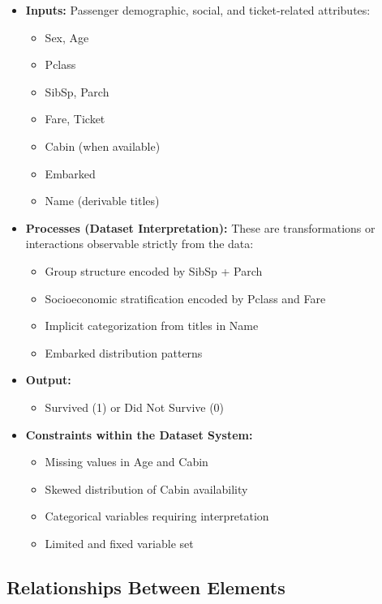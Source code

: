 \documentclass[12pt]{report}
\begin{document}
\begin{itemize}
    \item \textbf{Inputs:}  
    Passenger demographic, social, and ticket-related attributes:
    \begin{itemize}
        \item Sex, Age
        \item Pclass
        \item SibSp, Parch
        \item Fare, Ticket
        \item Cabin (when available)
        \item Embarked
        \item Name (derivable titles)
    \end{itemize}

    \item \textbf{Processes (Dataset Interpretation):}
    These are transformations or interactions observable strictly from the data:
    \begin{itemize}
        \item Group structure encoded by SibSp + Parch
        \item Socioeconomic stratification encoded by Pclass and Fare
        \item Implicit categorization from titles in Name
        \item Embarked distribution patterns
    \end{itemize}

    \item \textbf{Output:}
    \begin{itemize}
        \item Survived (1) or Did Not Survive (0)
    \end{itemize}

    \item \textbf{Constraints within the Dataset System:}
    \begin{itemize}
        \item Missing values in Age and Cabin
        \item Skewed distribution of Cabin availability
        \item Categorical variables requiring interpretation
        \item Limited and fixed variable set
    \end{itemize}

\end{itemize}

\subsection*{Relationships Between Elements}
\end{document}

